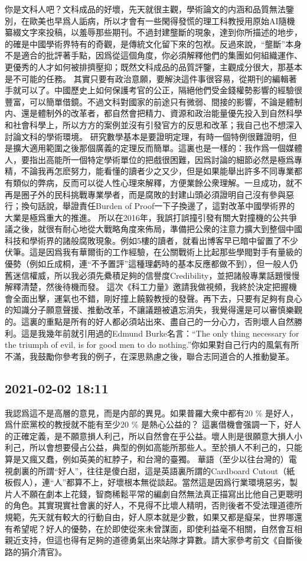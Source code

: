 \documentclass[twocolumn]{ctexart}
\begin{document}
你是文科人吧？文科成品的好壞，先天就很主觀，學術論文的内涵和品質無法鑒別，在歐美也早爲人詬病，所以才會有一些閑得發慌的理工科教授用原始AI隨機纂綴文字來投稿，以羞辱那些期刊。不過封建壟斷的現象，達到你所描述的地步，的確是中國學術界特有的奇觀，是傳統文化留下來的包袱。反過來說，“壟斷”本身不是適合的批評著手點，因爲從這個角度，你必須解釋他們的集團如何組織運作、更優秀的人才如何被排擠壓抑；既然文科成品的品質評鑒，主觀成分很大，那基本是不可能的任務。
其實只要有政治意願，要解決這件事很容易，從期刊的編輯著手就可以了。中國歷史上如何保護考官的公正，隔絕他們受金錢權勢影響的經驗很豐富，可以簡單借鏡。不過文科對國家的前途只有微弱、間接的影響，不論是體制内、還是體制外的改革者，都自然會把精力、資源和政治能量優先投入到自然科學和社會科學上，所以方方的案例並沒有引發官方的反思和改革；我自己也不想深入討論文科的學術環境。
研究數學基本是要證明定理，有時一個特例很難證明，但是擴大適用範圍之後那個廣義的定理反而簡單。這裏也是一樣的：我作爲一個媒體人，要指出高能所一個特定學術單位的把戲很困難，因爲討論的細節必然是極爲專精，不論我再怎麽努力，能看懂的讀者少之又少，但是如果能舉出許多不同專業都有類似的弊病，反而可以從人性心理來解釋，方便業餘公衆理解。一旦成功，就不再是圈子外的民科挑戰專業學者，而是腐敗的封建山頭必須證明自己沒有參與惡行；換句話說，舉證責任Burden of Proof一下子換邊了，這對改革中國學術界的大業是極爲重大的推進。
所以在2016年，我誤打誤撞引發有關大對撞機的公共爭議之後，就很有耐心地從大戰略角度來佈局，準備把公衆的注意力擴大到整個中國科技和學術界的諸般腐敗現象。例如5樓的讀者，就看出博客早已暗中留置了不少伏筆。這是因爲我有華爾街的工作經驗，在公關戰術上比起那些學閥對手有量級的優勢（例如丘成桐，連“不予置評”這種理虧時的基本反應都做不到），但一般人仍舊迷信權威，所以我必須先纍積足夠的信譽度Credibility，並把諸般專業話題慢慢解釋清楚，然後待機而發。
這次《科工力量》邀請我做視頻，我終於決定把握機會全面出擊，運氣也不錯，剛好撞上饒毅教授的發聲。再下去，只要有足夠有良心的知識分子願意聲援、推動改革，不讓議題被遺忘消失，我覺得還是可以審慎樂觀的。這裏的重點是所有的好人都必須站出來、盡自己的一分心力，否則壞人自然勝利。這是我幾年前就引用過的Edmund Burke名言：“The only thing necessary for the triumph of evil, is for good men to do nothing.”你如果對自己行内的風氣有所不滿，我鼓勵你參考我的例子，在深思熟慮之後，聯合志同道合的人推動變革。
\subsection*{2021-02-02 18:11}

我認爲這不是高層的意見，而是内部的異見。如果普羅大衆中都有20 \% 是好人，爲什麽黨校的教授就不能有至少20 \% 是熱心公益的？
這裏借機會强調一下，好人的正確定義，是不願意損人利己，所以自然會在乎公益。壞人則是很願意大損人小利己，所以會想要侵占公益，典型的例如高能所那些人。至於損人不利己的，只能算是又瘋又蠢，例如英美的紅脖子，和台灣的臺獨。
華語（至少以往台灣的）電視劇裏的所謂“好人”，往往是傻白甜，這是英語裏所謂的Cardboard Cutout（紙板假人），連“人”都算不上，好壞根本無從談起。當然這是因爲行業環境惡劣，製片人不願在劇本上花錢，智商稀鬆平常的編劇自然無法真正描寫出比他自己更聰明的角色。其實現實社會裏的好人，不見得不比壞人精明，否則後者不受法理道德所規範，先天就有較大的行動自由，好人原本就是少數，如果又都是癡呆，世界哪還有希望呢？好人的優勢，在於即使從來未曾謀面，即使利益毫不相關，自然會互相親近支持，但這也得有足夠的道德勇氣出來站隊才算數。請大家參考前文《自斷後路的狷介清官》。
\end{document}
